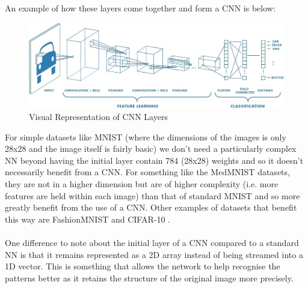 An example of how these layers come together and form a CNN is below:
\begin{figure}[htbp]
	\centering
    \includegraphics[scale=0.3]{background/cnn_example.jpeg}
    \caption{Visual Representation of CNN Layers \cite{eli5_convnet}}
    \label{fig:cnn-layers}
\end{figure}

For simple datasets like MNIST (where the dimensions of the images is only 28x28 and the image itself is fairly basic) we don't need a particularly complex NN beyond having the initial layer contain 784 (28x28) weights and so it doesn't necessarily benefit from a CNN. 
For something like the MedMNIST \cite{medmnist} datasets, they are not in a higher dimension but are of higher complexity (i.e. more features are held within each image) than that of standard MNIST and so more greatly benefit from the use of a CNN. 
Other examples of datasets that benefit this way are FashionMNIST \cite{fashion} and CIFAR-10 \cite{cifar}.
\\ \\
One difference to note about the initial layer of a CNN compared to a standard NN is that it remains represented as a 2D array instead of being streamed into a 1D vector. 
This is something that allows the network to help recognise the patterns better as it retains the structure of the original image more precisely.
